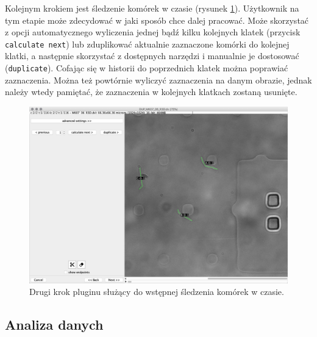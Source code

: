 \documentclass[declaration,shortabstract,mgr]{iithesis}
\begin{document}
Kolejnym krokiem jest śledzenie komórek w czasie (rysunek \ref{fig:ui-step-tracker}).
Użytkownik na tym etapie może zdecydować w jaki sposób chce dalej pracować.
Może skorzystać z opcji automatycznego wyliczenia jednej bądź kilku kolejnych klatek (przycisk \texttt{calculate next}) lub zduplikować aktualnie zaznaczone komórki do kolejnej klatki, a następnie skorzystać z dostępnych narzędzi i manualnie je dostosować (\texttt{duplicate}).
Cofając się w historii do poprzednich klatek można poprawiać zaznaczenia. Można też powtórnie wyliczyć zaznaczenia na danym obrazie, jednak należy wtedy pamiętać, że zaznaczenia w kolejnych klatkach zostaną usunięte.

\begin{figure}
  \centering
  \includegraphics[width=\textwidth]{images/ui-step-tracker.png}
  \caption{Drugi krok pluginu służący do wstępnej śledzenia komórek w czasie.}
  \label{fig:ui-step-tracker}
\end{figure}

\subsection{Analiza danych}
\end{document}
